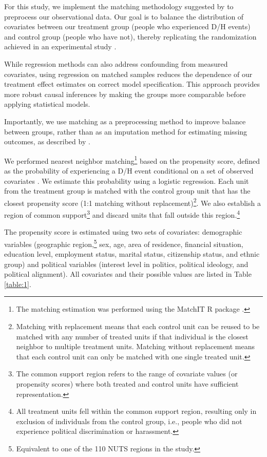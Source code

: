 \documentclass{article}
\begin{document}
For this study, we implement the matching methodology suggested by \textcite{ho_matching_2007} to preprocess our observational data. Our goal is to balance the distribution of covariates between our treatment group (people who experienced D/H events) and control group (people who have not), thereby replicating the randomization achieved in an experimental study \parencite{stuart_matching_2010}.

While regression methods can also address confounding from measured covariates, using regression on matched samples reduces the dependence of our treatment effect estimates on correct model specification. This approach provides more robust causal inferences by making the groups more comparable before applying statistical models.

Importantly, we use matching as a preprocessing method to improve balance between groups, rather than as an imputation method for estimating missing outcomes, as described by \textcite{abadie_large_2006, abadie_matching_2016}.

We performed nearest neighbor matching\footnote{The matching estimation was performed using the MatchIT R package \parencite{ho_matchit_2011}.} based on the propensity score, defined as the probability of experiencing a D/H event conditional on a set of observed covariates \parencite{rubin_matching_1973, rosenbaum_central_1983}. We estimate this probability using a logistic regression. Each unit from the treatment group is matched with the control group unit that has the closest propensity score (1:1 matching without replacement)\footnote{Matching with replacement means that each control unit can be reused to be matched with any number of treated units if that individual is the closest neighbor to multiple treatment units. Matching without replacement means that each control unit can only be matched with one single treated unit.}. We also establish a region of common support\footnote{The common support region refers to the range of covariate values (or propensity scores) where both treated and control units have sufficient representation.} and discard units that fall outside this region.\footnote{All treatment units fell within the common support region, resulting only in exclusion of individuals from the control group, i.e., people who did not experience political discrimination or harassment.}

The propensity score is estimated using two sets of covariates: demographic variables (geographic region,\footnote{Equivalent to one of the 110 NUTS regions in the study.} sex, age, area of residence, financial situation, education level, employment status, marital status, citizenship status, and ethnic group) and political variables (interest level in politics, political ideology, and political alignment). All covariates and their possible values are listed in Table \ref{table:1}.
\end{document}
